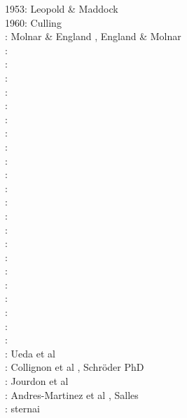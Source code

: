 \begin{scriptsize}
1953: Leopold \& Maddock \cite{lema53}\\
1960: Culling \cite{cull60}\\
\nineteenninety: Molnar \& England \cite{moen90}, England \& Molnar \cite{enmo90}\\
\nineteenninetytwo: \cite{befh92}\cite{chas92}\\
\nineteenninetythree: \cite{povp93}\cite{wibf93}\\
\nineteenninetyfour: \cite{howa94}\cite{koon94}\cite{kobe94}\cite{gikb94}\\
\nineteenninetyfive: \cite{chmm95}\cite{koon95}\\
\nineteenninetysix: \cite{avbu96}\cite{bekh96}\cite{kobe96}\\
\nineteenninetyseven: \cite{brsa97}\cite{gaft97}\cite{babr97}\\
\nineteenninetyeight: \cite{deea98}\cite{vabr98}\\
\nineteenninetynine: \cite{will99a}\cite{bupi99}\cite{babr99}\cite{tobr99}\\
\twothousandone: \cite{zemk01}\cite{tulg01}\cite{brsh01}\cite{bupo01}\cite{coul01}\cite{crda01}\cite{moln01}\\
\twothousandtwo: \cite{wibr02}\cite{mobr02}\cite{garc02}\cite{whtu02}\\
\twothousandthree: \cite{brau03}\\
\twothousandfour: \cite{fijj04}\cite{gocl04}\cite{simp04}\cite{skdi04}\\
\twothousandfive: \cite{lave05}\cite{will05}\cite{lahd05}\\
\twothousandsix: \cite{rosw06}\cite{brau06}\cite{bocr06}\cite{simp06}\cite{stwr06}\cite{golc06}\\
\twothousandseven: \cite{buto07}\cite{sebp07}\cite{tomk07}\cite{strw07}\\
\twothousandeight: \cite{alle08}\cite{rowf08}\\
\twothousandnine: \cite{whip09}\cite{kuhe09}\cite{makh09}\cite{pina09}\cite{dala09}\cite{bonn09}\\
\twothousandten: \cite{will10}\cite{tuha10}\cite{brau10}\cite{brau10}\cite{brya10}\cite{crmw10}\\
\twothousandeleven: \cite{robr11}\cite{grhd11}\\
\twothousandtwelve: \cite{kiwh12}\cite{brvv12}\\
\twothousandthirteen: \cite{vehc13}\cite{brwi13}\cite{fihv13a}\cite{fihv13b}\cite{brrs13}\cite{chgz13}\cite{tuva13}
      \cite{caya13} \\
\twothousandfourteen: \cite{crbr14}\cite{cokm14}\cite{erhv14}\cite{erhv15}\cite{stsc14}\cite{olbm14} \\
\twothousandfifteen: Ueda et al \cite{uewg15,fohk15,cofk15}\\
\twothousandsixteen: Collignon et al \cite{coyc16}, Schr{\"o}der PhD \cite{schr16}\\
\twothousandeighteen: Jourdon et al \cite{jolp18}\\
\twothousandnineteen: Andres-Martinez et al \cite{anpa19}, Salles \cite{sall19}\\
\twothousandtwenty: sternai \cite{ster20}
\end{scriptsize}

